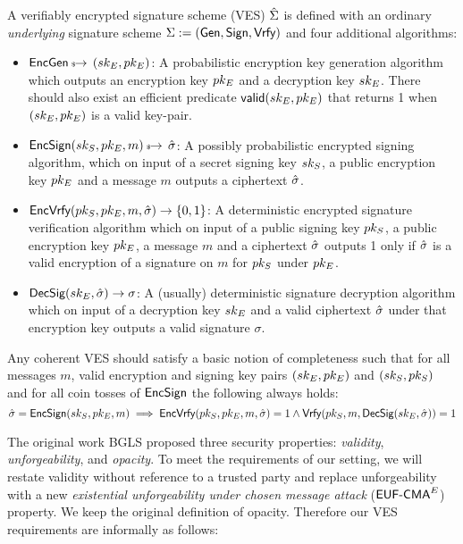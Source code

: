 \begin{definition}
\label{VES}
 A verifiably encrypted signature scheme (VES) $\hat{\Sigma}$ is defined with an ordinary \emph{underlying} signature scheme $\Sigma := (\textsf{Gen}, \textsf{Sign}, \textsf{Vrfy})$ and four additional algorithms:
    \begin{itemize}
        \item $\textsf{EncGen} \hskip2.3pt{\mbox{\tiny${\$}$\normalsize}}\!\!\rightarrow\, (sk_E, pk_E)$: A probabilistic encryption key generation algorithm which outputs an encryption key $pk_E$ and a decryption key $sk_E$. There should also exist an efficient predicate $\textsf{valid}(sk_E, pk_E)$ that returns 1 when $(sk_E, pk_E)$ is a valid key-pair.
        \item $\textsf{EncSign}(sk_S, pk_E, m) \hskip2.3pt{\mbox{\tiny${\$}$\normalsize}}\!\!\rightarrow\, \hat{\sigma}$: A possibly probabilistic encrypted signing algorithm, which on input of a secret signing key $sk_S$, a public encryption key $pk_E$ and a message $m$ outputs a ciphertext $\hat{\sigma}$.
        \item $\textsf{EncVrfy}(pk_S, pk_E, m, \hat{\sigma}) \rightarrow \{0,1\}$: A deterministic encrypted signature verification algorithm which on input of a public signing key $pk_S$, a public encryption key $pk_E$, a message $m$ and a ciphertext $\hat{\sigma}$ outputs 1 only if $\hat{\sigma}$ is a valid encryption of a signature on $m$ for $pk_S$ under $pk_E$.
        \item $\textsf{DecSig}(sk_E, \hat{\sigma}) \rightarrow \sigma$: A (usually) deterministic signature decryption algorithm which on input of a decryption key $sk_E$ and a valid ciphertext $\hat{\sigma}$ under that encryption key  outputs a valid signature $\sigma$.
    \end{itemize}

Any coherent VES should satisfy a basic notion of completeness such that for all messages $m$, valid encryption and signing key pairs $(sk_E, pk_E)$ and $(sk_S,pk_S)$ and for all coin tosses of $\textsf{EncSign}$ the following always holds:
    \[ \hat{\sigma} = \textsf{EncSign}(sk_S, pk_E, m) \implies \textsf{EncVrfy}(pk_S, pk_E, m, \hat{\sigma}) = 1 \land \textsf{Vrfy}(pk_S, m, \textsf{DecSig}(sk_E, \hat{\sigma})) = 1 \]
\end{definition}

The original work BGLS proposed three security properties: \emph{validity}, \emph{unforgeability}, and \emph{opacity}. To meet the requirements of our setting, we will restate validity without reference to a trusted party and replace unforgeability with a new \emph{existential unforgeability under chosen message attack} ($\textsf{EUF-CMA}^E$) property.
We keep the original definition of opacity. Therefore our VES requirements are informally as follows:

